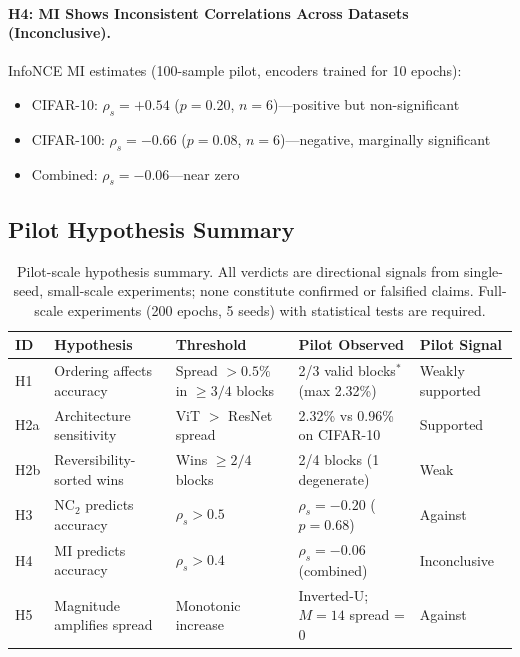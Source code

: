 \documentclass{article}
\begin{document}
\paragraph{H4: MI Shows Inconsistent Correlations Across Datasets (Inconclusive).}

InfoNCE MI estimates (100-sample pilot, encoders trained for 10 epochs):
\begin{itemize}
\item CIFAR-10: $\rho_s = +0.54$ ($p = 0.20$, $n=6$)---positive but non-significant
\item CIFAR-100: $\rho_s = -0.66$ ($p = 0.08$, $n=6$)---negative, marginally significant
\item Combined: $\rho_s = -0.06$---near zero
\end{itemize}

\subsection{Pilot Hypothesis Summary}

\begin{table}[t]
\centering
\caption{Pilot-scale hypothesis summary. All verdicts are directional signals from single-seed, small-scale experiments; none constitute confirmed or falsified claims. Full-scale experiments (200 epochs, 5 seeds) with statistical tests are required.}
\label{tab:hypothesis_summary}
\small
\begin{tabular}{lllll}
\toprule
\textbf{ID} & \textbf{Hypothesis} & \textbf{Threshold} & \textbf{Pilot Observed} & \textbf{Pilot Signal} \\
\midrule
H1 & Ordering affects accuracy & Spread $> 0.5\%$ in $\geq 3/4$ blocks & 2/3 valid blocks$^*$ (max 2.32\%) & Weakly supported \\
H2a & Architecture sensitivity & ViT $>$ ResNet spread & 2.32\% vs 0.96\% on CIFAR-10 & Supported \\
H2b & Reversibility-sorted wins & Wins $\geq 2/4$ blocks & 2/4 blocks (1 degenerate) & Weak \\
H3 & NC$_2$ predicts accuracy & $\rho_s > 0.5$ & $\rho_s = -0.20$ ($p=0.68$) & Against \\
H4 & MI predicts accuracy & $\rho_s > 0.4$ & $\rho_s = -0.06$ (combined) & Inconclusive \\
H5 & Magnitude amplifies spread & Monotonic increase & Inverted-U; $M\!=\!14$ spread = 0 & Against \\
\bottomrule
\end{tabular}
\end{table}
\end{document}
